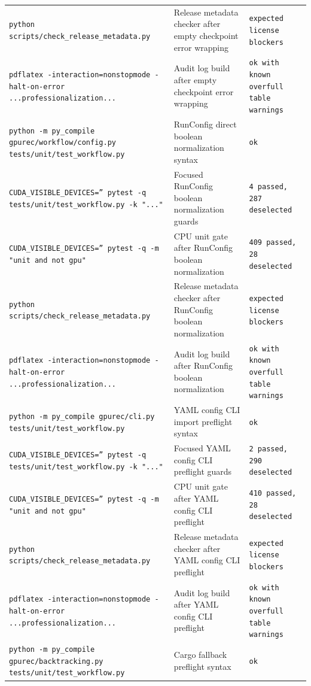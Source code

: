 \documentclass[11pt]{article}
\begin{document}
\begin{center}
\begin{tabular}{lll}
\texttt{python scripts/check\_release\_metadata.py} &
Release metadata checker after empty checkpoint error wrapping &
\texttt{expected license blockers} \\
\texttt{pdflatex -interaction=nonstopmode -halt-on-error ...professionalization...} &
Audit log build after empty checkpoint error wrapping &
\texttt{ok with known overfull table warnings} \\
\texttt{python -m py\_compile gpurec/workflow/config.py tests/unit/test\_workflow.py} &
RunConfig direct boolean normalization syntax &
\texttt{ok} \\
\texttt{CUDA\_VISIBLE\_DEVICES='' pytest -q tests/unit/test\_workflow.py -k "..."} &
Focused RunConfig boolean normalization guards &
\texttt{4 passed, 287 deselected} \\
\texttt{CUDA\_VISIBLE\_DEVICES='' pytest -q -m "unit and not gpu"} &
CPU unit gate after RunConfig boolean normalization &
\texttt{409 passed, 28 deselected} \\
\texttt{python scripts/check\_release\_metadata.py} &
Release metadata checker after RunConfig boolean normalization &
\texttt{expected license blockers} \\
\texttt{pdflatex -interaction=nonstopmode -halt-on-error ...professionalization...} &
Audit log build after RunConfig boolean normalization &
\texttt{ok with known overfull table warnings} \\
\texttt{python -m py\_compile gpurec/cli.py tests/unit/test\_workflow.py} &
YAML config CLI import preflight syntax &
\texttt{ok} \\
\texttt{CUDA\_VISIBLE\_DEVICES='' pytest -q tests/unit/test\_workflow.py -k "..."} &
Focused YAML config CLI preflight guards &
\texttt{2 passed, 290 deselected} \\
\texttt{CUDA\_VISIBLE\_DEVICES='' pytest -q -m "unit and not gpu"} &
CPU unit gate after YAML config CLI preflight &
\texttt{410 passed, 28 deselected} \\
\texttt{python scripts/check\_release\_metadata.py} &
Release metadata checker after YAML config CLI preflight &
\texttt{expected license blockers} \\
\texttt{pdflatex -interaction=nonstopmode -halt-on-error ...professionalization...} &
Audit log build after YAML config CLI preflight &
\texttt{ok with known overfull table warnings} \\
\texttt{python -m py\_compile gpurec/backtracking.py tests/unit/test\_workflow.py} &
Cargo fallback preflight syntax &
\texttt{ok} \\

\end{tabular}
\end{center}
\end{document}
